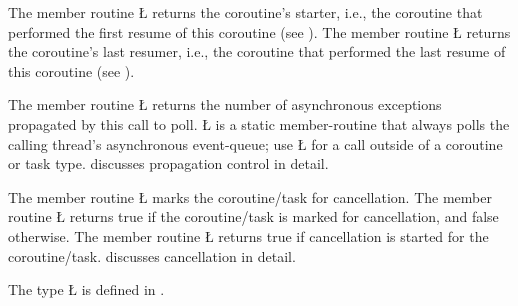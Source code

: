 \documentclass[openright,twoside]{report}
\begin{document}
The member routine \LGinlinetrue\LGbegin\lgrinde\L{}\endlgrinde\LGend{} returns the coroutine's starter, i.e., the coroutine that performed the first resume of this coroutine (see ).
The member routine \LGinlinetrue\LGbegin\lgrinde\L{}\endlgrinde\LGend{} returns the coroutine's last resumer, i.e., the coroutine that performed the last resume of this coroutine (see ).

\begin{sloppypar}
The member routine \LGinlinetrue\LGbegin\lgrinde\L{}\endlgrinde\LGend{} returns the number of asynchronous exceptions propagated by this call to poll.
\LGinlinetrue\LGbegin\lgrinde\L{}\endlgrinde\LGend{} is a static member-routine that always polls the calling thread's asynchronous event-queue;
use \LGinlinetrue\LGbegin\lgrinde\L{}\endlgrinde\LGend{} for a call outside of a coroutine or task type.
 discusses propagation control in detail.
\end{sloppypar}

The member routine \LGinlinetrue\LGbegin\lgrinde\L{}\endlgrinde\LGend{} marks the coroutine/task for cancellation.
The member routine \LGinlinetrue\LGbegin\lgrinde\L{}\endlgrinde\LGend{} returns true if the coroutine/task is marked for cancellation, and false otherwise.
The member routine \LGinlinetrue\LGbegin\lgrinde\L{}\endlgrinde\LGend{} returns true if cancellation is started for the coroutine/task.
 discusses cancellation in detail.

The type \LGinlinetrue\LGbegin\lgrinde\L{}\endlgrinde\LGend{} is defined in .
\end{document}
